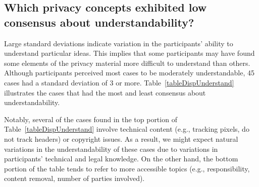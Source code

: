 \subsection{Which privacy concepts exhibited low consensus about understandability?}




Large standard deviations indicate variation in the participants' ability to understand particular ideas.
This implies that some participants may have found some elements of the privacy material more difficult to understand than others.
Although participants perceived most cases to be moderately understandable, 45 cases had a standard deviation of 3 or more.
Table~\ref{tableDispUnderstand} illustrates the cases that had the most and least consensus about understandability.


Notably, several of the cases found in the top portion of Table~\ref{tableDispUnderstand} involve technical content (e.g., tracking pixels, do not track headers) or copyright issues.
As a result, we might expect natural variations in the understandability of these cases due to variations in participants' technical and legal knowledge.
On the other hand, the bottom portion of the table tends to refer to more accessible topics (e.g., responsibility, content removal, number of parties involved).

